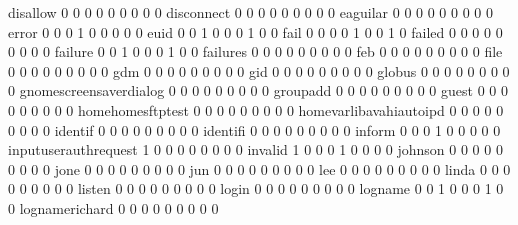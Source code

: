 \documentclass[compress,8pt]{beamer}
\begin{document}
\begin{frame}
\begin{Schunk}
  disallow                                   0   0   0   0   0   0   0   0   0
  disconnect                                 0   0   0   0   0   0   0   0   0
  eaguilar                                   0   0   0   0   0   0   0   0   0
  error                                      0   0   0   1   0   0   0   0   0
  euid                                       0   0   1   0   0   0   1   0   0
  fail                                       0   0   0   0   1   0   0   1   0
  failed                                     0   0   0   0   0   0   0   0   0
  failure                                    0   0   1   0   0   0   1   0   0
  failures                                   0   0   0   0   0   0   0   0   0
  feb                                        0   0   0   0   0   0   0   0   0
  file                                       0   0   0   0   0   0   0   0   0
  gdm                                        0   0   0   0   0   0   0   0   0
  gid                                        0   0   0   0   0   0   0   0   0
  globus                                     0   0   0   0   0   0   0   0   0
  gnomescreensaverdialog                     0   0   0   0   0   0   0   0   0
  groupadd                                   0   0   0   0   0   0   0   0   0
  guest                                      0   0   0   0   0   0   0   0   0
  homehomesftptest                           0   0   0   0   0   0   0   0   0
  homevarlibavahiautoipd                     0   0   0   0   0   0   0   0   0
  identif                                    0   0   0   0   0   0   0   0   0
  identifi                                   0   0   0   0   0   0   0   0   0
  inform                                     0   0   0   1   0   0   0   0   0
  inputuserauthrequest                       1   0   0   0   0   0   0   0   0
  invalid                                    1   0   0   0   1   0   0   0   0
  johnson                                    0   0   0   0   0   0   0   0   0
  jone                                       0   0   0   0   0   0   0   0   0
  jun                                        0   0   0   0   0   0   0   0   0
  lee                                        0   0   0   0   0   0   0   0   0
  linda                                      0   0   0   0   0   0   0   0   0
  listen                                     0   0   0   0   0   0   0   0   0
  login                                      0   0   0   0   0   0   0   0   0
  logname                                    0   0   1   0   0   0   1   0   0
  lognamerichard                             0   0   0   0   0   0   0   0   0

\end{Schunk}
\end{frame}
\end{document}
